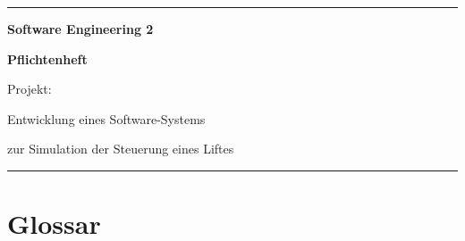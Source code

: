 

\begin{titlepage}
	\vspace*{\fill}

	\rule{\textwidth}{0.25pt}

	\vspace*{1cm}

	\begin{singlespace}
		\begin{center}	\Large	\bfseries
			Software Engineering 2
		\end{center}
	\end{singlespace}

	\vspace{1em}

	\begin{singlespace}
		\begin{center}	\Large \bfseries
		Pflichtenheft
		
		\vspace{2em}	\large
		Projekt:
		
		Entwicklung eines Software-Systems
		
		zur Simulation der Steuerung eines Liftes
		\end{center}
	\end{singlespace}

	\vspace*{5cm}

	\rule{\textwidth}{0.25pt}

	\vspace*{\fill}
\end{titlepage}


\tableofcontents



\chapter{Glossar}
\glsaddall %
\printglossary[title=Allgemeiner Glossar, toctitle=Allgemeiner Glossar, type=allg]
\printglossary[title=Projektspezifischer Glossar, toctitle=Projektspezifischer Glossar]

